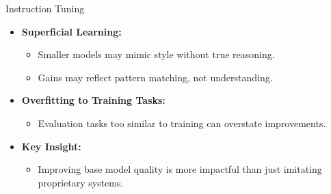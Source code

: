 \begin{frame}[allowframebreaks]{Instruction Tuning}
\begin{itemize}
            \begin{itemize}
                \item Evaluation often uses proprietary models, which may not reveal all biases or limitations.
            \end{itemize}
            \framebreak
            \item \textbf{Superficial Learning:}
            \begin{itemize}
                \item Smaller models may mimic style without true reasoning.
                \item Gains may reflect pattern matching, not understanding.
            \end{itemize}
            \item \textbf{Overfitting to Training Tasks:}
            \begin{itemize}
                \item Evaluation tasks too similar to training can overstate improvements.
            \end{itemize}
            \item \textbf{Key Insight:}
            \begin{itemize}
                \item Improving base model quality is more impactful than just imitating proprietary systems.
            \end{itemize}
        \end{itemize}
\end{frame}